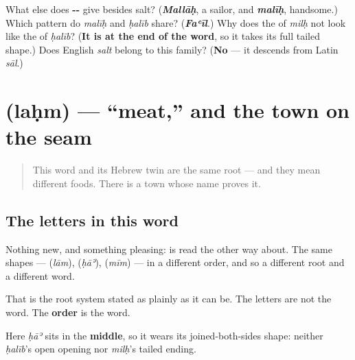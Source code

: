 \begin{tcolorbox}[breakable,colback=teal!4,colframe=teal!35!black,title={Before you move on}]
What else does \textbf{--} give besides salt? (\emph{\textbf{Mallāḥ}}, a sailor, and \emph{\textbf{malīḥ}}, handsome.) Which pattern do \emph{malīḥ} and \emph{ḥalīb} share? (\emph{\textbf{Faʿīl}}.) Why does the \textbf{} of \emph{milḥ} not look like the \textbf{} of \emph{ḥalīb}? (\textbf{It is at the end of the word}, so it takes its full tailed shape.) Does English \emph{salt} belong to this family? (\textbf{No} — it descends from Latin \emph{sāl}.)
\end{tcolorbox}
\section[\texorpdfstring{\ar{لحم} (laḥm)}{لحم (laḥm)}]{ (laḥm) — \textquotedblleft{}meat,\textquotedblright{} and the town on the seam}

\label{lesson:AR-C34-lahm}



\begin{quote}
This word and its Hebrew twin are the same root — and they mean different foods. There is a town whose name proves it.
\end{quote}

\subsection*{The letters in this word}
Nothing new, and something pleasing: \textbf{} is \textbf{} read the other way about. The same shapes — \textbf{} (\emph{lām}), \textbf{} (\emph{ḥāʾ}), \textbf{} (\emph{mīm}) — in a different order, and so a different root and a different word.

That is the root system stated as plainly as it can be. The letters are not the word. The \textbf{order} is the word.

Here \emph{ḥāʾ} sits in the \textbf{middle}, so it wears its joined-both-sides shape: neither \emph{ḥalīb}'s open opening nor \emph{milḥ}'s tailed ending.

